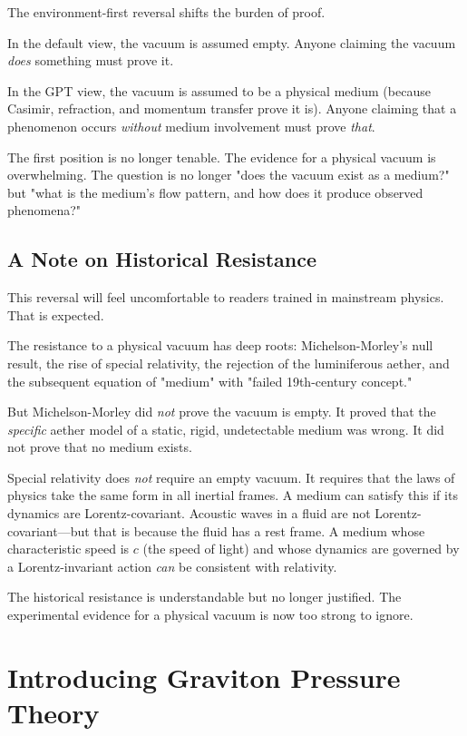 \documentclass[12pt, a4paper]{article}
\begin{document}
The environment-first reversal shifts the burden of proof.

In the default view, the vacuum is assumed empty. Anyone claiming the vacuum \textit{does} something must prove it.

In the GPT view, the vacuum is assumed to be a physical medium (because Casimir, refraction, and momentum transfer prove it is). Anyone claiming that a phenomenon occurs \textit{without} medium involvement must prove \textit{that}.

The first position is no longer tenable. The evidence for a physical vacuum is overwhelming. The question is no longer "does the vacuum exist as a medium?" but "what is the medium's flow pattern, and how does it produce observed phenomena?"

\subsection{A Note on Historical Resistance}
\label{subsec:historical_resistance}

This reversal will feel uncomfortable to readers trained in mainstream physics. That is expected.

The resistance to a physical vacuum has deep roots: Michelson-Morley's null result, the rise of special relativity, the rejection of the luminiferous aether, and the subsequent equation of "medium" with "failed 19th-century concept."

But Michelson-Morley did \textit{not} prove the vacuum is empty. It proved that the \textit{specific} aether model of a static, rigid, undetectable medium was wrong. It did not prove that no medium exists.

Special relativity does \textit{not} require an empty vacuum. It requires that the laws of physics take the same form in all inertial frames. A medium can satisfy this if its dynamics are Lorentz-covariant. Acoustic waves in a fluid are not Lorentz-covariant—but that is because the fluid has a rest frame. A medium whose characteristic speed is \(c\) (the speed of light) and whose dynamics are governed by a Lorentz-invariant action \textit{can} be consistent with relativity.

The historical resistance is understandable but no longer justified. The experimental evidence for a physical vacuum is now too strong to ignore.
\section{Introducing Graviton Pressure Theory}
\label{sec:GPT_intro}
\end{document}
